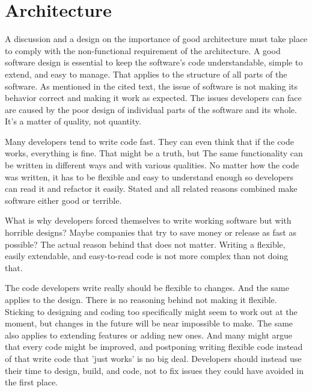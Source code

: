 \section{Architecture}

A discussion and a design on the importance of good architecture must take place to comply with the non-functional requirement of the architecture.
A good software design is essential to keep the software's code understandable, simple to extend, and easy to manage.
That applies to the structure of all parts of the software.
As mentioned in the cited text, the issue of software is not making its behavior correct and making it work as expected.
The issues developers can face are caused by the poor design of individual parts of the software and its whole.
It's a matter of quality, not quantity.

Many developers tend to write code fast.
They can even think that if the code works, everything is fine.
That might be a truth, but 
The same functionality can be written in different ways and with various qualities.
No matter how the code was written, it has to be flexible and easy to understand enough so developers can read it and refactor it easily.
Stated and all related reasons combined make software either good or terrible.

What is why developers forced themselves to write working software but with horrible designs?
Maybe companies that try to save money or release as fast as possible?
The actual reason behind that does not matter.
Writing a flexible, easily extendable, and easy-to-read code is not more complex than not doing that.

The code developers write really should be flexible to changes.
And the same applies to the design.
There is no reasoning behind not making it flexible.
Sticking to designing and coding too specifically might seem to work out at the moment, but changes in the future will be near impossible to make.
The same also applies to extending features or adding new ones.
And many might argue that every code might be improved, and postponing writing flexible code instead of that write code that 'just works' is no big deal.
Developers should instead use their time to design, build, and code, not to fix issues they could have avoided in the first place.

